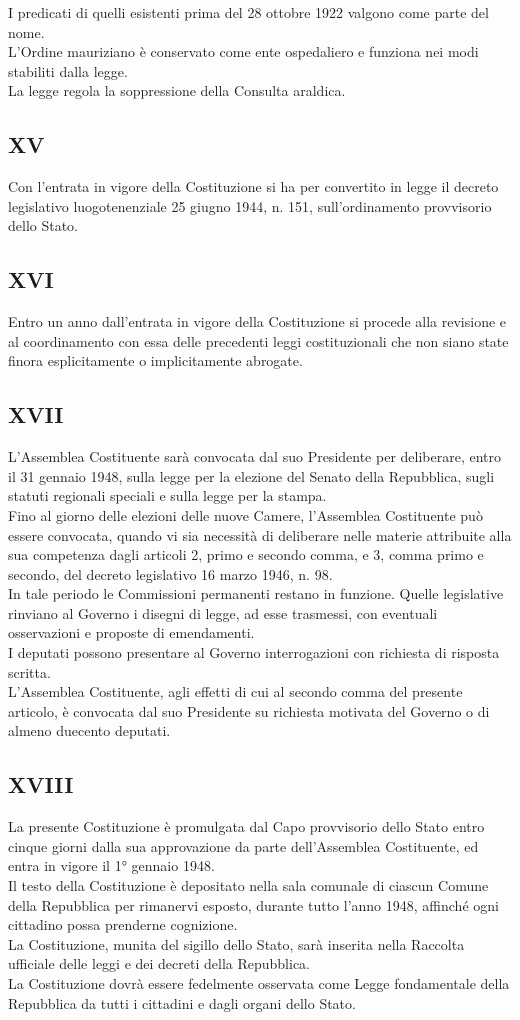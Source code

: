 \documentclass{article}
\newcommand{\disposizione}[1]{
	\subsection*{#1}
}
\begin{document}
I predicati di quelli esistenti prima del 28 ottobre 1922 valgono come parte del nome.\\
L’Ordine mauriziano è conservato come ente ospedaliero e funziona nei modi stabiliti dalla legge.\\
La legge regola la soppressione della Consulta araldica.
\disposizione{XV}
Con l’entrata in vigore della Costituzione si ha per convertito in legge il decreto legislativo luogotenenziale 25 giugno 1944, n. 151, sull’ordinamento provvisorio dello Stato.
\disposizione{XVI}
Entro un anno dall’entrata in vigore della Costituzione si procede alla revisione e al coordinamento con essa delle precedenti leggi costituzionali che non siano state finora esplicitamente o implicitamente abrogate.
\disposizione{XVII}
L’Assemblea Costituente sarà convocata dal suo Presidente per deliberare, entro il 31 gennaio 1948, sulla legge per la elezione del Senato della Repubblica, sugli statuti regionali speciali e sulla legge per la stampa.\\
Fino al giorno delle elezioni delle nuove Camere, l’Assemblea Costituente può essere convocata, quando vi sia necessità di deliberare nelle materie attribuite alla sua competenza dagli articoli 2, primo e secondo comma, e 3, comma primo e secondo, del decreto legislativo 16 marzo 1946, n. 98.\\
In tale periodo le Commissioni permanenti restano in funzione. Quelle legislative rinviano al Governo i disegni di legge, ad esse trasmessi, con eventuali osservazioni e proposte di emendamenti.\\
I deputati possono presentare al Governo interrogazioni con richiesta di risposta scritta.\\
L’Assemblea Costituente, agli effetti di cui al secondo comma del presente articolo, è convocata dal suo Presidente su richiesta motivata del Governo o di almeno duecento deputati.
\disposizione{XVIII}
La presente Costituzione è promulgata dal Capo provvisorio dello Stato entro cinque giorni dalla sua approvazione da parte dell’Assemblea Costituente, ed entra in vigore il 1° gennaio 1948.\\
Il testo della Costituzione è depositato nella sala comunale di ciascun Comune della Repubblica per rimanervi esposto, durante tutto l’anno 1948, affinché ogni cittadino possa prenderne cognizione.\\
La Costituzione, munita del sigillo dello Stato, sarà inserita nella Raccolta ufficiale delle leggi e dei decreti della Repubblica.\\
La Costituzione dovrà essere fedelmente osservata come Legge fondamentale della Repubblica da tutti i cittadini e dagli organi dello Stato.
\end{document}
